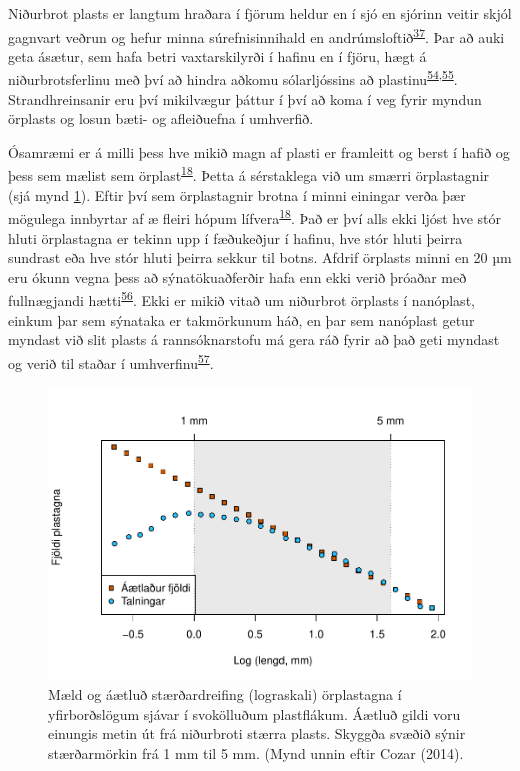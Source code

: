 \documentclass[icelandic,]{book}
\begin{document}
Niðurbrot plasts er langtum hraðara í fjörum heldur en í sjó en sjórinn veitir skjól gagnvart veðrun og hefur minna súrefnisinnihald en andrúmsloftið\textsuperscript{\protect\hyperlink{ref-andrady2011microplastics}{37}}. Þar að auki geta ásætur, sem hafa betri vaxtarskilyrði í hafinu en í fjöru, hægt á niðurbrotsferlinu með því að hindra aðkomu sólarljóssins að plastinu\textsuperscript{\protect\hyperlink{ref-o2010degradation}{54},\protect\hyperlink{ref-muthukumar2011fouling}{55}}. Strandhreinsanir eru því mikilvægur þáttur í því að koma í veg fyrir myndun örplasts og losun bæti- og afleiðuefna í umhverfið.

Ósamræmi er á milli þess hve mikið magn af plasti er framleitt og berst í hafið og þess sem mælist sem örplast\textsuperscript{\protect\hyperlink{ref-cozar2014plastic}{18}}. Þetta á sérstaklega við um smærri örplastagnir (sjá mynd \ref{fig:cozer}). Eftir því sem örplastagnir brotna í minni einingar verða þær mögulega innbyrtar af æ fleiri hópum lífvera\textsuperscript{\protect\hyperlink{ref-cozar2014plastic}{18}}. Það er því alls ekki ljóst hve stór hluti örplastagna er tekinn upp í fæðukeðjur í hafinu, hve stór hluti þeirra sundrast eða hve stór hluti þeirra sekkur til botns. Afdrif örplasts minni en 20 µm eru ókunn vegna þess að sýnatökuaðferðir hafa enn ekki verið þróaðar með fullnægjandi hætti\textsuperscript{\protect\hyperlink{ref-RENNER201855}{56}}. Ekki er mikið vitað um niðurbrot örplasts í nanóplast, einkum þar sem sýnataka er takmörkunum háð, en þar sem nanóplast getur myndast við slit plasts á rannsóknarstofu má gera ráð fyrir að það geti myndast og verið til staðar í umhverfinu\textsuperscript{\protect\hyperlink{ref-lambert2016formation}{57}}.

\begin{figure}[H]

{\centering \includegraphics[width=0.8\linewidth]{_bookdown_files/OrplastHaf_files/figure-latex/cozer-1} 

}

\caption{Mæld og áætluð stærðardreifing (lograskali) örplastagna í yfirborðslögum sjávar í svokölluðum plastflákum. Áætluð gildi voru einungis metin út frá niðurbroti stærra plasts. Skyggða svæðið sýnir stærðarmörkin frá 1 mm til 5 mm. (Mynd unnin eftir Cozar (2014). }\label{fig:cozer}
\end{figure}
\end{document}
